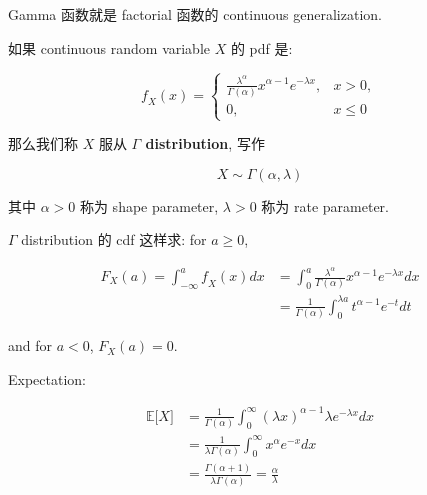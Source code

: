 Gamma 函数就是 factorial 函数的 continuous generalization.

\begin{definition}{}

如果 continuous random variable \(\mathit{X}\) 的 pdf 是:

\[\mathit{f}_{\mathit{X}}(\mathit{x}) = \left\{ \begin{matrix}
{\frac{\mathit{\lambda}^{\mathit{\alpha}}}{\Gamma(\mathit{\alpha})}\mathit{x}^{\mathit{\alpha} - 1}\mathit{e}^{- \mathit{\lambda}\mathit{x}},} & {\mathit{x} > 0,} \\
{0,} & {\mathit{x} \leq 0}
\end{matrix} \right.\]

那么我们称 \(\mathit{X}\) 服从 \textbf{\(\Gamma\) distribution}, 写作

\[\mathit{X} \sim \Gamma(\mathit{\alpha},\mathit{\lambda})\]

其中 \(\mathit{\alpha} > 0\) 称为 shape parameter, \(\mathit{\lambda} > 0\) 称为 rate parameter.

\end{definition}

\(\Gamma\) distribution 的 cdf 这样求: for \(\mathit{a} \geq 0\),

\[\begin{matrix}
{\mathit{F}_{\mathit{X}}(\mathit{a}) = \int_{- \infty}^{\mathit{a}}\mathit{f}_{\mathit{X}}(\mathit{x})\mathit{d}\mathit{x}} & {= \int_{0}^{\mathit{a}}\frac{\mathit{\lambda}^{\mathit{\alpha}}}{\Gamma(\mathit{\alpha})}\mathit{x}^{\mathit{\alpha} - 1}\mathit{e}^{- \mathit{\lambda}\mathit{x}}\mathit{d}\mathit{x}} \\
 & {= \frac{1}{\Gamma(\mathit{\alpha})}\int_{0}^{\mathit{\lambda}\mathit{a}}\mathit{t}^{\mathit{\alpha} - 1}\mathit{e}^{- \mathit{t}}\mathit{d}\mathit{t}}
\end{matrix}\]

and for \(\mathit{a} < 0\), \(\mathit{F}_{\mathit{X}}(\mathit{a}) = 0\).

Expectation:

\[\begin{matrix}
{\mathbb{E}\lbrack\mathit{X}\rbrack} & {= \frac{1}{\Gamma(\mathit{\alpha})}\int_{0}^{\infty}(\mathit{\lambda}\mathit{x})^{\mathit{\alpha} - 1}\mathit{\lambda}\mathit{e}^{- \mathit{\lambda}\mathit{x}}\mathit{d}\mathit{x}} \\
 & {= \frac{1}{\mathit{\lambda}\Gamma(\mathit{\alpha})}\int_{0}^{\infty}\mathit{x}^{\mathit{\alpha}}\mathit{e}^{- \mathit{x}}\mathit{d}\mathit{x}} \\
 & {= \frac{\Gamma(\mathit{\alpha} + 1)}{\mathit{\lambda}\Gamma(\mathit{\alpha})} = \frac{\mathit{\alpha}}{\mathit{\lambda}}}
\end{matrix}\]

